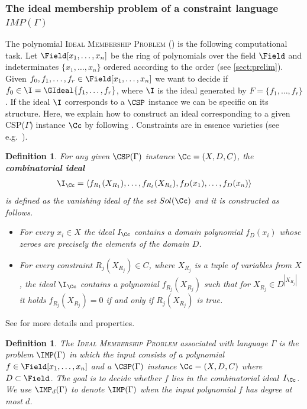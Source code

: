 \documentclass[11pt]{article}
\newtheorem{definition}[theorem]{Definition}
\begin{document}
\subsubsection[The ideal membership problem of a constraint language IMP(Gamma)]{The ideal membership problem of a constraint language $IMP(\Gamma)$}\label{sec:IMPdef}

The polynomial \textsc{Ideal Membership Problem} (\IMP) is the following computational task.
Let $\Field[x_1, \ldots, x_n]$ be the ring of polynomials over the field $\Field$ and indeterminates $\{x_1,\ldots, x_n\}$ ordered according to the \grlex order (see \cref{sect:prelim}).
Given $f_0,f_1,\ldots,f_r\in \Field[x_1, \ldots, x_n]$ we want to decide if $f_0\in \I= \GIdeal{f_1,\ldots, f_r}$, where $\I$ is the ideal generated by $F=\{f_1,\ldots , f_r\}$.
If the ideal $\I$ corresponds to a $\CSP$ instance we can be specific on its structure. 
Here, we explain how to construct an ideal corresponding to a given CSP($\Gamma$) instance $\Cc$ by following \cite{Mastrolilli21TALG}. Constraints are in essence varieties (see e.g.~\cite{vandongenPhd,JeffersonJGD13}). 
\begin{definition}\label{def:combinatorial_ideal}
For any given $\CSP(\Gamma)$ instance $\Cc=(X,D,C)$, the \textbf{\emph{combinatorial ideal}} 
%
\begin{align}\label{eq:comb_Id}
    \I_\Cc=\langle f_{R_1}(X_{R_1}),\ldots,f_{R_\ell}(X_{R_\ell}),f_D(x_1),\ldots,f_D(x_n)\rangle
\end{align} 
%
is defined as the vanishing ideal of the set $Sol(\Cc)$ and it is constructed as follows.
\begin{itemize}
    \item For every $x_i\in X$ the ideal $I_\Cc$ contains a domain polynomial $f_D(x_i)$ whose zeroes are precisely the elements of the domain $D$.
    \item For every constraint $R_j(X_{R_j})\in C$, where $X_{R_j}$ is a tuple of variables from $X$, the ideal $\I_\Cc$ contains a polynomial $f_{R_j}(X_{R_j})$ such that for $X_{R_j}\in D^{|X_{R_j}|}$ it holds $f_{R_j}(X_{R_j})=0$ if and only if $R_j(X_{R_j})$ is true.
\end{itemize}   
\end{definition}
  See \cite{Mastrolilli21TALG} for more details and properties. 
%
%
\begin{definition}\label{def:IMP}
 The {\emph{\textsc{Ideal Membership Problem}}} associated with language $\Gamma$ is the problem $\IMP(\Gamma)$ in which
 the input consists of a polynomial $f\in \Field[x_1, \ldots, x_n]$ and a $\CSP(\Gamma)$ instance $\Cc=(X,D,C)$ where $D\subset \Field$. The goal is to decide whether $f$ lies in the combinatorial ideal~$I_\Cc$. We use $\IMP_d(\Gamma)$ to denote $\IMP(\Gamma)$ when the input polynomial $f$ has degree at most $d$.
\end{definition}
\end{document}
